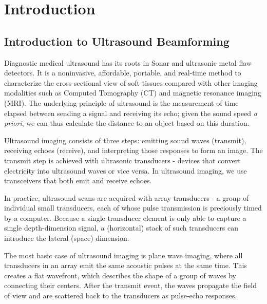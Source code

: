 \chapter{Introduction}


\section{Introduction to Ultrasound Beamforming}
 Diagnostic medical ultrasound has its roots in Sonar and ultrasonic metal flaw detectors. It is a noninvasive, affordable, portable, and real-time method to characterize the cross-sectional view of soft tissues compared with other imaging modalities such as Computed Tomography (CT) and magnetic resonance imaging (MRI). The underlying principle of ultrasound is the measurement of time elapsed between sending a signal and receiving its echo; given the sound speed \textit{a priori}, we can thus calculate the distance to an object based on this duration.

 Ultrasound imaging consists of three steps: emitting sound waves (transmit), receiving echoes (receive), and interpreting those responses to form an image. The transmit step is achieved with ultrasonic transducers - devices that convert electricity into ultrasound waves or vice versa. In ultrasound imaging, we use transceivers that both emit and receive echoes.

 In practice, ultrasound scans are acquired with array transducers - a group of individual small transducers, each of whose pulse transmission is preciously timed by a computer. Because a single transducer element is only able to capture a single depth-dimension signal, a (horizontal) stack of such transducers can introduce the lateral (space) dimension.

 The most basic case of ultrasound imaging is plane wave imaging, where all transducers in an array emit the same acoustic pulses at the same time. This creates a flat wavefront, which describes the shape of a group of waves by connecting their centers. After the transmit event, the waves propagate the field of view and are scattered back to the transducers as pulse-echo responses.



